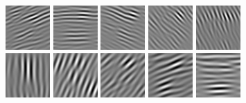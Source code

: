 \begin{figure}
\begin{center}
  \includegraphics[scale=0.5]{ch4/figures/real_1_3.jpg}
  \includegraphics[scale=0.5]{ch4/figures/real_1_4.jpg}
  \includegraphics[scale=0.5]{ch4/figures/real_1_5.jpg}
  \includegraphics[scale=0.5]{ch4/figures/real_1_6.jpg}
  \includegraphics[scale=0.5]{ch4/figures/real_1_7.jpg}\\
  \includegraphics[scale=0.5]{ch4/figures/real_2_0.jpg}
  \includegraphics[scale=0.5]{ch4/figures/real_2_1.jpg}
  \includegraphics[scale=0.5]{ch4/figures/real_2_2.jpg}
  \includegraphics[scale=0.5]{ch4/figures/real_2_3.jpg}
  \includegraphics[scale=0.5]{ch4/figures/real_2_4.jpg}

\end{center}
\end{figure}
